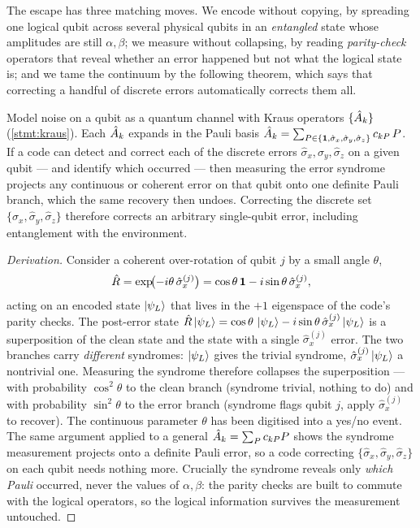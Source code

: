 The escape has three matching moves. We encode without copying, by
spreading one logical qubit across several physical qubits in an
\emph{entangled} state whose amplitudes are still $\alpha,\beta$; we
measure without collapsing, by reading \emph{parity-check} operators
that reveal whether an error happened but not what the logical state is;
and we tame the continuum by the following theorem, which says that
correcting a handful of discrete errors automatically corrects them all.

\begin{statement}
\label{stmt:digitisation}
Model noise on a qubit as a quantum channel with Kraus operators
$\{\hat{A}_k\}$ (\cref{stmt:kraus}). Each $\hat{A}_k$ expands in the Pauli
basis $\hat{A}_k=\sum_{P\in\{\mathbf{1},\hat\sigma_x,\hat\sigma_y,\hat\sigma_z\}}
c_{kP}\,P$. If a code can detect and correct each of the discrete errors
$\hat\sigma_x,\hat\sigma_y,\hat\sigma_z$ on a given qubit --- and
identify which occurred --- then measuring the error syndrome projects
any continuous or coherent error on that qubit onto one definite Pauli
branch, which the same recovery then undoes. Correcting the discrete set
$\{\hat\sigma_x,\hat\sigma_y,\hat\sigma_z\}$ therefore corrects an
arbitrary single-qubit error, including entanglement with the
environment.
\end{statement}

\begin{proof}[Derivation]
Consider a coherent over-rotation of qubit $j$ by a small angle $\theta$,
\begin{equation}
\hat{R}=\exp\!\bigl(-i\theta\,\hat\sigma_x^{(j)}\bigr)
=\cos\theta\,\mathbf{1}-i\sin\theta\,\hat\sigma_x^{(j)},
\end{equation}
acting on an encoded state $\ket{\psi_L}$ that lives in the $+1$
eigenspace of the code's parity checks. The post-error state
$\hat{R}\ket{\psi_L}=\cos\theta\,\ket{\psi_L}-i\sin\theta\,
\hat\sigma_x^{(j)}\ket{\psi_L}$
is a superposition of the clean state and the state with a single
$\hat\sigma_x^{(j)}$ error. The two branches carry \emph{different}
syndromes: $\ket{\psi_L}$ gives the trivial syndrome,
$\hat\sigma_x^{(j)}\ket{\psi_L}$ a nontrivial one. Measuring the
syndrome therefore collapses the superposition --- with probability
$\cos^2\theta$ to the clean branch (syndrome trivial, nothing to do) and
with probability $\sin^2\theta$ to the error branch (syndrome flags
qubit $j$, apply $\hat\sigma_x^{(j)}$ to recover). The continuous
parameter $\theta$ has been digitised into a yes/no event. The same
argument applied to a general $\hat{A}_k=\sum_P c_{kP}P$ shows the
syndrome measurement projects onto a definite Pauli error, so a code
correcting $\{\hat\sigma_x,\hat\sigma_y,\hat\sigma_z\}$ on each qubit
needs nothing more. Crucially the syndrome reveals only \emph{which
Pauli} occurred, never the values of $\alpha,\beta$: the parity checks
are built to commute with the logical operators, so the logical
information survives the measurement untouched.
\end{proof}


